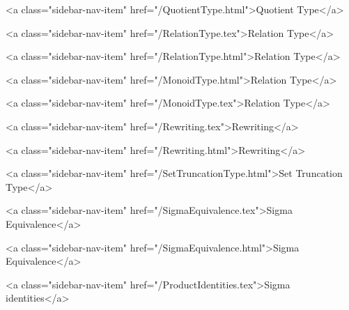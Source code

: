           <a class="sidebar-nav-item" href="/QuotientType.html">Quotient Type</a>
        
      
    
      
        
          <a class="sidebar-nav-item" href="/RelationType.tex">Relation Type</a>
        
      
    
      
        
          <a class="sidebar-nav-item" href="/RelationType.html">Relation Type</a>
        
      
    
      
        
          <a class="sidebar-nav-item" href="/MonoidType.html">Relation Type</a>
        
      
    
      
        
          <a class="sidebar-nav-item" href="/MonoidType.tex">Relation Type</a>
        
      
    
      
        
          <a class="sidebar-nav-item" href="/Rewriting.tex">Rewriting</a>
        
      
    
      
        
          <a class="sidebar-nav-item" href="/Rewriting.html">Rewriting</a>
        
      
    
      
        
          <a class="sidebar-nav-item" href="/SetTruncationType.html">Set Truncation Type</a>
        
      
    
      
        
          <a class="sidebar-nav-item" href="/SigmaEquivalence.tex">Sigma Equivalence</a>
        
      
    
      
        
          <a class="sidebar-nav-item" href="/SigmaEquivalence.html">Sigma Equivalence</a>
        
      
    
      
        
          <a class="sidebar-nav-item" href="/ProductIdentities.tex">Sigma identities</a>
        
      
    
      
        
